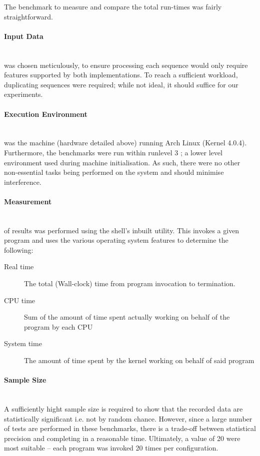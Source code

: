 The benchmark to measure and compare the total run-times was fairly straightforward.

\paragraph{Input Data} \hfill \\
was chosen meticulously, to ensure processing each sequence would only require features supported by both implementations. To reach a sufficient workload, duplicating sequences were required; while not ideal, it should suffice for our experiments.

\paragraph{Execution Environment} \hfill \\
was the machine (hardware detailed above) running Arch Linux (Kernel 4.0.4). Furthermore, the benchmarks were run within runlevel 3 \autocite{runlevels}; a lower level environment used during machine initialisation. As such, there were no other non-essential tasks being performed on the system and should minimise interference.

\paragraph{Measurement} \hfill \\
of results was performed using the shell's inbuilt  utility. This invokes a given program and uses the various operating system features to determine the following:
\begin{description}
	\item[Real time] The total (Wall-clock) time from program invocation to termination.
	\item[CPU time] Sum of the amount of time spent actually working on behalf of the program by each CPU
	\item[System time] The amount of time spent by the kernel working on behalf of said program
\end{description}

\paragraph{Sample Size} \hfill \\
A sufficiently hight sample size is required to show that the recorded data are statistically significant i.e. not by random chance. However, since a large number of tests are performed in these benchmarks, there is a trade-off between statistical precision and completing in a reasonable time.
Ultimately, a value of 20 were most suitable -- each program was invoked 20 times per configuration.

